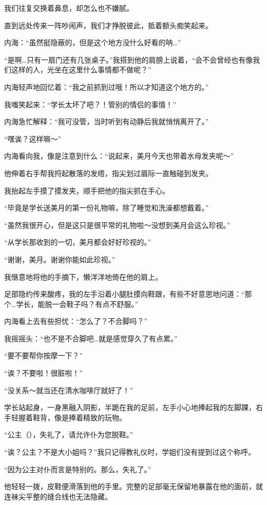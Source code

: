 我们往复交换着鼻息，却怎么也不嫌腻。

直到远处传来一阵吵闹声，我们才挣脱彼此，抵着额头痴笑起来。

内海：“虽然挺隐蔽的，但是这个地方没什么好看的呐…”

“是啊…只有一扇门还有几张桌子。”我搭到他的肩膀上说着，“会不会曾经也有像我们这样的人，光坐在这里什么事情都不做呢？”

内海轻声地回忆着：“我之前抓到过哦！所以才知道这个地方的。”

我嗤笑起来：“学长太坏了吧？！管别的情侣的事情！”

内海急忙解释：“我可没管，当时听到有动静后我就悄悄离开了。”

“嘿诶？这样嘛～”

内海看向我，像是注意到什么：“说起来，美月今天也带着水母发夹呢～”

他伸着右手帮我捋起散落的发绺，指尖划过眉际一直触碰到发夹。

我抬起左手摸了摸发夹，顺手把他的指尖抓在手心。

“毕竟是学长送美月的第一份礼物嘛，除了睡觉和洗澡都想戴着。”

“虽然我很开心，但是这只是很平常的礼物啦～没想到美月会这么珍视。”

“从学长那收到的一切，美月都会好好珍视的。”

“谢谢，美月。谢谢你能如此珍视。”

我惬意地将他的手摘下，懒洋洋地倚在他的肩上。

足部隐约传来酸疼，我的左手沿着小腿肚摸向鞋跟，有些不好意思地问道：“那个…学长，能脱一会鞋子吗？有点不舒服。”

内海看上去有些担忧：“怎么了？不合脚吗？”

我摇摇头：“也不是不合脚吧…就是感觉穿久了有点累。”

“要不要帮你按摩一下？”

“诶？不要啦！很脏啦！”

“没关系～就当还在清水咖啡厅就好了！”

学长站起身，一身黑融入阴影，半跪在我的足前，左手小心地捧起我的左脚踝，右手轻握着鞋背，像是捧着精致的玩物。

“公主（），失礼了，请允许仆为您脱鞋。”

“诶？公主？不是大小姐吗？”我只记得教礼仪时，学姐们没有提到过这个称呼。

“因为公主对仆而言是特别的。那么，失礼了。”

他轻轻一拨，皮鞋便滑落到他的手里。完整的足部毫无保留地暴露在他的面前，就连袜尖平整的缝合线也无法隐藏。

